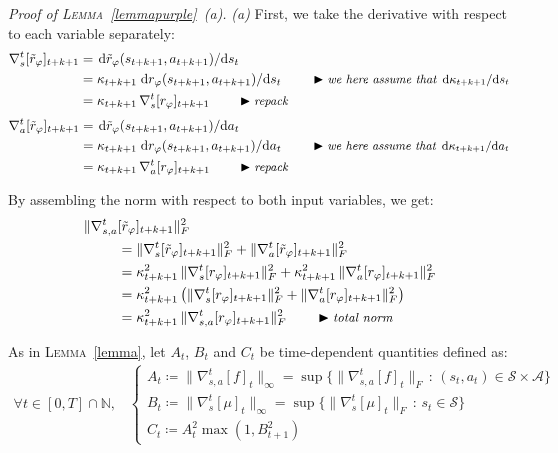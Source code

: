 \emph{Proof of \textsc{Lemma}~\ref{lemmapurple}~\emph{(a)}.}
\emph{(a)} First, we take the derivative with respect to each variable separately:
\begin{align}
\nabla_s^t[\tilde{r}_\varphi]_{t+k+1}
&= \dv*{\tilde{r}_\varphi (s_{t+k+1}, a_{t+k+1})}{s_t} \\
&= \kappa_{t+k+1} \dv*{r_\varphi (s_{t+k+1}, a_{t+k+1})}{s_t}
\qquad
\blacktriangleright\text{\small{\textit{we here assume that $\dv*{\kappa_{t+k+1}}{s_t}$}}} \\
&= \kappa_{t+k+1} \, \nabla_s^t[r_\varphi]_{t+k+1}
\qquad
\blacktriangleright\text{\small{\textit{repack}}}
\end{align}
\begin{align}
\nabla_a^t[\tilde{r}_\varphi]_{t+k+1}
&= \dv*{\tilde{r}_\varphi (s_{t+k+1}, a_{t+k+1})}{a_t} \\
&= \kappa_{t+k+1} \dv*{r_\varphi (s_{t+k+1}, a_{t+k+1})}{a_t}
\qquad
\blacktriangleright\text{\small{\textit{we here assume that $\dv*{\kappa_{t+k+1}}{a_t}$}}} \\
&= \kappa_{t+k+1} \, \nabla_a^t[r_\varphi]_{t+k+1}
\qquad
\blacktriangleright\text{\small{\textit{repack}}}
\end{align}

By assembling the norm with respect to both input variables, we get:
\begin{align}
\lVert \nabla_{s,a}^t&[\tilde{r}_\varphi]_{t+k+1} \rVert ^2_F \nonumber \\
&= \lVert \nabla_s^t[\tilde{r}_\varphi]_{t+k+1} \rVert ^2_F
+ \lVert \nabla_a^t[\tilde{r}_\varphi]_{t+k+1} \rVert ^2_F \\
&= \kappa_{t+k+1}^2 \, \lVert \nabla_s^t[r_\varphi]_{t+k+1} \rVert ^2_F
+ \kappa_{t+k+1}^2 \, \lVert \nabla_a^t[r_\varphi]_{t+k+1} \rVert ^2_F \\
&= \kappa_{t+k+1}^2 \, \big(\lVert \nabla_s^t[r_\varphi]_{t+k+1} \rVert ^2_F
+ \lVert \nabla_a^t[r_\varphi]_{t+k+1} \rVert ^2_F\big) \\
&=
\kappa_{t+k+1}^2 \, \lVert \nabla_{s,a}^t[r_\varphi]_{t+k+1} \rVert ^2_F
\qquad
\blacktriangleright\text{\small{\textit{total norm}}}
\end{align}

As in \textsc{Lemma}~\ref{lemma}, let $A_t$, $B_t$ and $C_t$ be time-dependent quantities defined as:
\begin{align}
\forall t \in [0, T] \cap \mathbb{N} \text{,} \quad
\begin{cases}
A_t \coloneqq \lVert\nabla_{s,a}^t[f]_t\rVert _\infty
= \sup \big\{\lVert\nabla_{s,a}^t[f]_t\rVert _F \, : \, (s_t, a_t) \in
\mathcal{S} \times \mathcal{A} \big\} \\
B_t \coloneqq \lVert\nabla_s^t[\mu]_t\rVert _\infty
= \sup \big\{\lVert\nabla_s^t[\mu]_t\rVert _F \, : \, s_t \in
\mathcal{S} \big\} \\
C_t \coloneqq A_t^2 \max(1, B_{t+1}^2)
\end{cases}
\label{aandbpurple}
\end{align}

